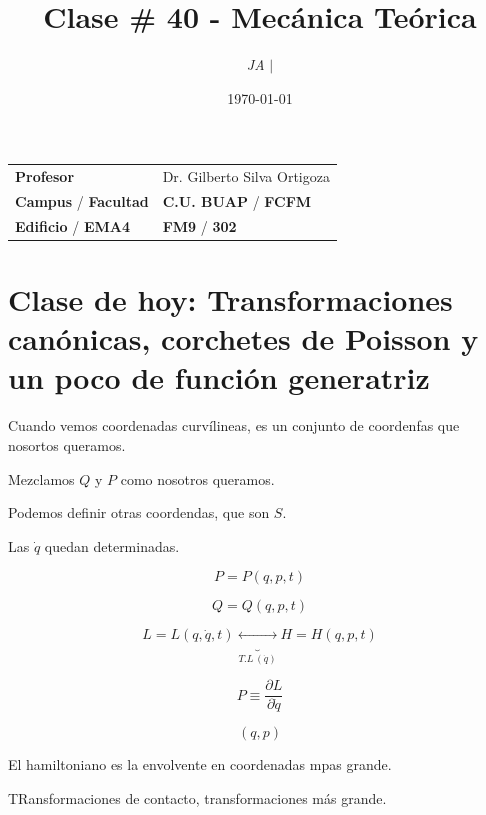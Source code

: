 \documentclass{article}
\title{Clase \# 40 - Mecánica Teórica}
\author{\emph{JA} $\boldsymbol{\mid}$}
\date{\today}
\begin{document}
\maketitle



\begin{mybox}
\noindent\begin{tabular}{@{}ll}
	{\bfseries{Profesor}} & Dr. Gilberto Silva Ortigoza\\
	\textcolor{prussianblue}{\bfseries{Campus}} / \textcolor{trueblue}{\bfseries{Facultad}}  & \textcolor{prussianblue}{\bfseries{C.U. BUAP}} /  \textcolor{trueblue}{\bfseries{FCFM}} \\
	\textcolor{prussianblue}{\bfseries{Edificio}} /  \textcolor{trueblue}{\bfseries{EMA4}}    & 	\textcolor{prussianblue}{\bfseries{FM9}} /  \textcolor{trueblue}{\bfseries{302}}   
\end{tabular} 
\end{mybox} \vspace{1cm}

\tableofcontents

\vspace{2cm}

\section{Clase de hoy: Transformaciones canónicas, corchetes de Poisson y un poco de función generatriz}




Cuando vemos coordenadas curvílineas, es un conjunto de coordenfas que nosortos queramos.


Mezclamos $Q$ y $P$ como nosotros queramos.


Podemos definir otras coordendas, que son $S$. 



Las $\dot{q}$ quedan determinadas.


\[ P = P(q,p,t) \]


\[ Q = Q(q,p,t) \]


\[ L = L(q,\dot{q},t)   \underbrace{\leftrightarrow}_{T.L\, (\dot{q})} H=H(q,p,t)   \]


\[  P \equiv \frac{\partial L}{\partial \dot{q}} \]


\[ (q,p) \]


El hamiltoniano es la envolvente en coordenadas mpas grande.

TRansformaciones de contacto, transformaciones más grande.
\end{document}
